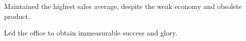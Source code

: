 \begin{achievements}
	\item Maintained the highest sales average, despite the weak economy and obsolete product.
	\item Led the office to obtain immeasurable success and glory.
\end{achievements}
